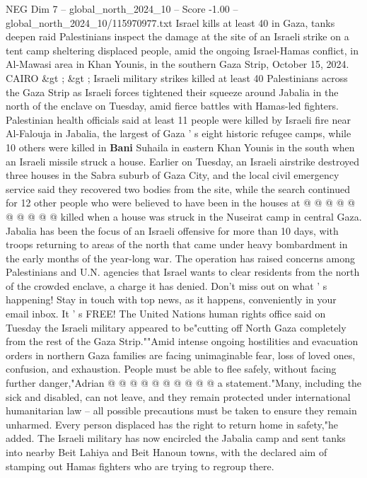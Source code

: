 \begin{textsample}{NEG Dim 7 – global\_north\_2024\_10 – Score -1.00 – global\_north\_2024\_10/115970977.txt}  \label{ex:f7_neg_363}
Israel kills at least 40 in Gaza, tanks deepen raid Palestinians inspect the damage at the site of an Israeli strike on a tent camp sheltering displaced people, amid the ongoing Israel-Hamas conflict, in Al-Mawasi area in Khan Younis, in the southern Gaza Strip, October 15, 2024.
CAIRO \&gt ; \&gt ; Israeli military strikes killed at least 40 Palestinians across the Gaza Strip as Israeli forces tightened their squeeze around Jabalia in the north of the enclave on Tuesday, amid fierce battles with Hamas-led fighters.
Palestinian health officials said at least 11 people were killed by Israeli fire near Al-Falouja in Jabalia, the largest of Gaza ' s eight historic refugee camps, while 10 others were killed in \textbf{Bani} Suhaila in eastern Khan Younis in the south when an Israeli missile struck a house.
Earlier on Tuesday, an Israeli airstrike destroyed three houses in the Sabra suburb of Gaza City, and the local civil emergency service said they recovered two bodies from the site, while the search continued for 12 other people who were believed to have been in the houses at @ @ @ @ @ @ @ @ @ @ killed when a house was struck in the Nuseirat camp in central Gaza.
Jabalia has been the focus of an Israeli offensive for more than 10 days, with troops returning to areas of the north that came under heavy bombardment in the early months of the year-long war.
The operation has raised concerns among Palestinians and U.N. agencies that Israel wants to clear residents from the north of the crowded enclave, a charge it has denied.
Don't miss out on what ' s happening!
Stay in touch with top news, as it happens, conveniently in your email inbox.
It ' s FREE!
The United Nations human rights office said on Tuesday the Israeli military appeared to be"cutting off North Gaza completely from the rest of the Gaza Strip.""Amid intense ongoing hostilities and evacuation orders in northern Gaza families are facing unimaginable fear, loss of loved ones, confusion, and exhaustion.
People must be able to flee safely, without facing further danger,"Adrian @ @ @ @ @ @ @ @ @ @ a statement."Many, including the sick and disabled, can not leave, and they remain protected under international humanitarian law -- all possible precautions must be taken to ensure they remain unharmed.
Every person displaced has the right to return home in safety,"he added.
The Israeli military has now encircled the Jabalia camp and sent tanks into nearby Beit Lahiya and Beit Hanoun towns, with the declared aim of stamping out Hamas fighters who are trying to regroup there.

\end{textsample}
